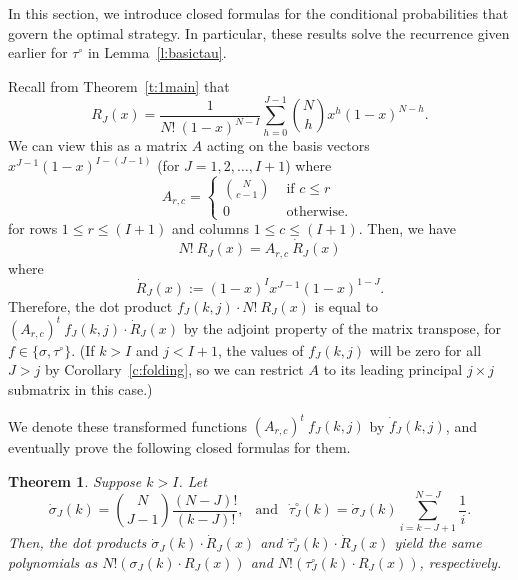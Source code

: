\documentclass[11pt]{amsart}   %
\newtheorem{theorem}{Theorem}[section]
\theoremstyle{definition}
\theoremstyle{remark}
\numberwithin{equation}{section}
\theoremstyle{theorem}
\begin{document}
In this section, we introduce closed formulas for the conditional probabilities that govern the optimal strategy.  In particular, these results solve the recurrence given earlier for $\tau^\circ$ in Lemma~\ref{l:basictau}.

Recall from Theorem~\ref{t:1main} that 
\[ R_J(x) = \frac{1}{N!\ (1-x)^{N-I}} \sum_{h=0}^{J-1} {N \choose h} x^h(1-x)^{N-h}. \]
We can view this as a matrix $A$ acting on the basis vectors $x^{J-1}(1-x)^{I-(J-1)}$ (for $J = 1, 2, \ldots, I+1$) where
\[ A_{r, c} = \begin{cases} {N \choose c-1} & \text{ if $c \leq r$ } \\ 0 & \text{ otherwise. } \end{cases} \]
for rows $1 \leq r \leq (I+1)$ and columns $1 \leq c \leq (I+1)$.  Then, we have
\[ N!\ R_J(x) = A_{r,c} \ \dot{R}_J(x) \]
where 
\[ \dot{R}_J(x) := (1-x)^I x^{J-1}(1-x)^{1-J}. \]
Therefore, the dot product $f_J(k, j) \cdot N!\ R_J(x)$ is equal to $\left(A_{r,c}\right)^t \ f_J(k, j) \cdot \dot{R}_J(x)$ by the adjoint property of the matrix transpose, for $f \in \{\sigma, \tau^\circ\}$.  (If $k > I$ and $j < I+1$, the values of $f_J(k,j)$ will be zero for all $J > j$ by Corollary~\ref{c:folding}, so we can restrict $A$ to its leading principal $j \times j$ submatrix in this case.)

We denote these transformed functions $\left(A_{r,c}\right)^t\ f_J(k,j)$ by $\dot{f}_J(k,j)$, and eventually prove the following closed formulas for them.

\begin{theorem}\label{t:rebasis}
    Suppose $k > I$.  Let 
    \[ \dot\sigma_J(k) = {N \choose {J-1}} \frac{(N-J)!}{(k-J)!}, \ \ \text{ and } \ \  \dot\tau_J^\circ(k) = \dot\sigma_J(k) \sum_{i=k-J+1}^{N-J} \frac{1}{i}. \]
    Then, the dot products $\dot\sigma_J(k) \cdot \dot{R}_J(x)$ and $\dot\tau^\circ_J(k) \cdot \dot{R}_J(x)$ yield the same polynomials as $N! (\sigma_J(k) \cdot R_J(x))$ and $N! (\tau^\circ_J(k) \cdot R_J(x))$, respectively.
\end{theorem}
\end{document}
